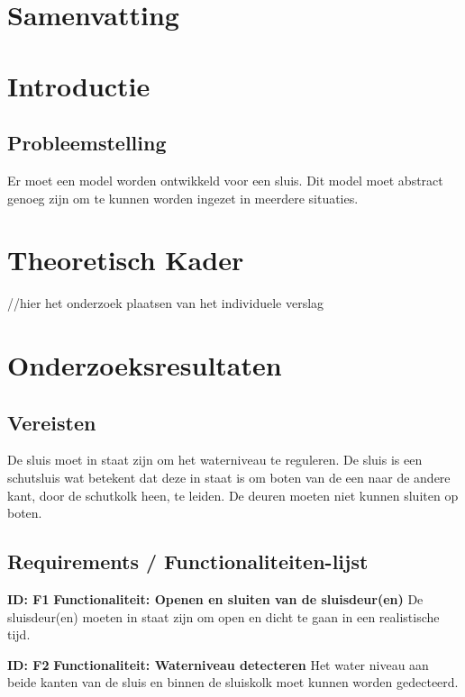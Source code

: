 \documentclass{article}
\begin{document}
\section{Samenvatting}
\section{Introductie}
\subsection{Probleemstelling}
Er moet een model worden ontwikkeld voor een sluis. Dit model moet abstract genoeg zijn om te kunnen worden ingezet in meerdere situaties.
\section{Theoretisch Kader}
//hier het onderzoek plaatsen van het individuele verslag
\section{Onderzoeksresultaten}

\subsection{Vereisten}

De sluis moet in staat zijn om het waterniveau te reguleren. De sluis is een schutsluis wat betekent dat deze in staat is om boten van de een naar de andere kant, door de schutkolk heen, te leiden. De deuren moeten niet kunnen sluiten op boten.


\subsection{Requirements / Functionaliteiten-lijst}
\textbf{ID: F1} \newline
\textbf{Functionaliteit: Openen en sluiten van de sluisdeur(en)} \newline
De sluisdeur(en) moeten in staat zijn om open en dicht te gaan in een realistische tijd. \newline

\textbf{ID: F2} \newline
\textbf{Functionaliteit: Waterniveau detecteren} \newline
Het water niveau aan beide kanten van de sluis en binnen de sluiskolk moet kunnen worden gedecteerd. \newline
\end{document}
